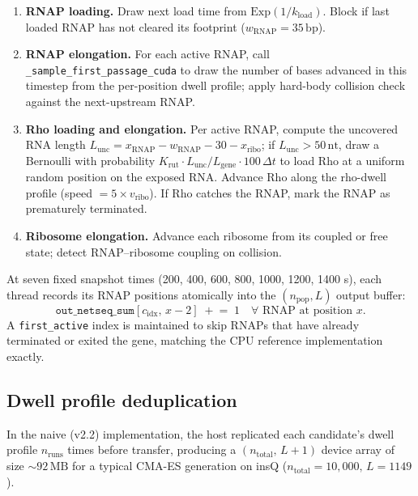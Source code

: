 \documentclass[11pt]{article}
\begin{document}
\begin{enumerate}
  \item \textbf{RNAP loading.} Draw next load time from
    $\text{Exp}(1/k_{\text{load}})$. Block if last loaded RNAP has not
    cleared its footprint ($w_{\text{RNAP}} = 35\,\text{bp}$).

  \item \textbf{RNAP elongation.} For each active RNAP, call
    \texttt{\_sample\_first\_passage\_cuda} to draw the number of bases
    advanced in this timestep from the per-position dwell profile; apply
    hard-body collision check against the next-upstream RNAP.

  \item \textbf{Rho loading and elongation.} Per active RNAP, compute the
    uncovered RNA length $L_{\text{unc}} = x_{\text{RNAP}} - w_{\text{RNAP}}
    - 30 - x_{\text{ribo}}$; if $L_{\text{unc}} > 50\,\text{nt}$, draw a
    Bernoulli with probability $K_{\text{rut}} \cdot L_{\text{unc}} /
    L_{\text{gene}} \cdot 100\,\Delta t$ to load Rho at a uniform random
    position on the exposed RNA. Advance Rho along the rho-dwell profile
    (speed $= 5 \times v_{\text{ribo}}$). If Rho catches the RNAP, mark
    the RNAP as prematurely terminated.

  \item \textbf{Ribosome elongation.} Advance each ribosome from its
    coupled or free state; detect RNAP--ribosome coupling on collision.
\end{enumerate}

At seven fixed snapshot times (200, 400, 600, 800, 1000, 1200, 1400 s),
each thread records its RNAP positions atomically into the
$(n_{\text{pop}}, L)$ output buffer:
\begin{equation}
  \texttt{out\_netseq\_sum}[c_{\text{idx}},\, x-2]
  \;\mathrel{+}=\; 1
  \quad \forall \text{ RNAP at position } x.
\end{equation}
A \texttt{first\_active} index is maintained to skip RNAPs that have
already terminated or exited the gene, matching the CPU reference
implementation exactly.

\subsection{Dwell profile deduplication}

In the naive (v2.2) implementation, the host replicated each candidate's dwell
profile $n_{\text{runs}}$ times before transfer, producing a
$(n_{\text{total}},\, L+1)$ device array of size $\sim 92\,\text{MB}$ for a
typical CMA-ES generation on insQ ($n_{\text{total}} = 10{,}000,\, L = 1149$).
\end{document}
